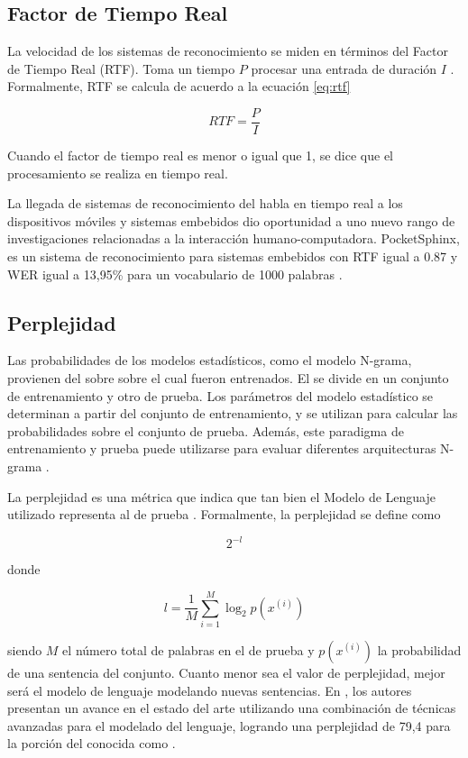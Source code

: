 \subsection{Factor de Tiempo Real}
\label{sec:rtf}

La velocidad de los sistemas de reconocimiento se miden en t\'erminos del Factor de Tiempo Real (RTF). Toma un tiempo $P$
procesar una entrada de duraci\'on $I$ \cite{VimalaReview2012}. Formalmente, RTF se calcula de acuerdo a la ecuaci\'on \eqref{eq:rtf}

\begin{equation}
\label{eq:rtf}
    RTF = \frac{P}{I}
\end{equation}

Cuando el factor de tiempo real es menor o igual que 1, se dice que el procesamiento se realiza en tiempo real.

La llegada de sistemas de reconocimiento del habla en tiempo real a los dispositivos m\'oviles y sistemas embebidos dio
oportunidad a uno nuevo rango de investigaciones relacionadas a la interacci\'on humano-computadora. PocketSphinx, es
un sistema de reconocimiento para sistemas embebidos con RTF igual a 0.87 y WER igual a 13,95\% para un vocabulario
de 1000 palabras \cite{HugginsDainesPocketSphinx2006}.

\subsection{Perplejidad}
\label{sec:perplexity}

Las probabilidades de los modelos estad\'isticos, como el modelo N-grama, provienen del  sobre
sobre el cual fueron entrenados. El  se divide en un conjunto de entrenamiento y otro de prueba.
Los par\'ametros del modelo estad\'istico se determinan a partir del conjunto de entrenamiento, y se utilizan
para calcular las probabilidades sobre el conjunto de prueba. Adem\'as, este paradigma de entrenamiento y prueba
puede utilizarse para evaluar diferentes arquitecturas N-grama \cite{Jurafsky}.

La perplejidad es una m\'etrica que indica que tan bien el Modelo de Lenguaje utilizado representa al  
de prueba \cite{RosenfeldStatistical1997}. Formalmente, la perplejidad se define como

\begin{equation*}
    2^{-l}
\end{equation*}

donde

\begin{equation*}
    l = \frac{1}{M}\sum_{i=1}^{M}\log_2p(x^{(i)})
\end{equation*}

siendo $M$ el n\'umero total de palabras en el  de prueba y $p(x^{(i)})$ la probabilidad de una 
sentencia del conjunto. Cuanto menor sea el valor de perplejidad, mejor ser\'a el modelo de lenguaje modelando
nuevas sentencias. En \cite{MikolovEmpirical2011}, los autores presentan un avance en el estado del arte
utilizando una combinaci\'on de t\'ecnicas avanzadas para el modelado del lenguaje, logrando una perplejidad
de 79,4 para la porci\'on del  conocida como .
